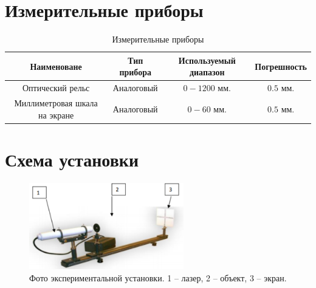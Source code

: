 \documentclass{article}
\begin{document}
\section{Измерительные приборы}
\begin{table}[h]
    \centering
    \bgroup
    \def\arraystretch{1.2}
    \begin{tabular}{|c|c|c|c|}
        \hline
        Наименоване & Тип прибора & Используемый диапазон & Погрешность \\
        \hline
        Оптический рельс & Аналоговый & $0-1200$ мм. & $0.5$ мм. \\
        \hline
        Миллиметровая шкала на экране & Аналоговый & $0-60$ мм. & $0.5$ мм. \\
        \hline
    \end{tabular}
    \egroup
    \caption{Измерительные приборы} 
\end{table}
\section{Схема установки}
\begin{figure}[h!]
    \begin{center}
    \includegraphics[width=0.6\textwidth]{scheme.png}
    \caption{Фото экспериментальной установки. 1 – лазер, 2 – объект, 3 – экран.}
    \label{fig:scheme}    
    \end{center}
\end{figure}
\end{document}
